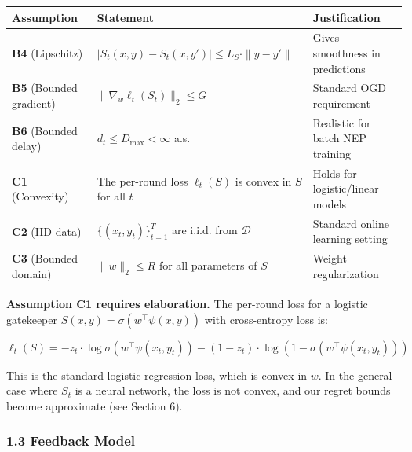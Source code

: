 \documentclass[
  12pt,
]{ctexart}
\begin{document}
\begin{longtable}[]{@{}
  >{\raggedright\arraybackslash}p{}
  >{\raggedright\arraybackslash}p{}
  >{\raggedright\arraybackslash}p{}@{}}
\toprule\noalign{}
\begin{minipage}[b]{\linewidth}\raggedright
Assumption
\end{minipage} & \begin{minipage}[b]{\linewidth}\raggedright
Statement
\end{minipage} & \begin{minipage}[b]{\linewidth}\raggedright
Justification
\end{minipage} \\
\midrule\noalign{}
\endhead
\bottomrule\noalign{}
\endlastfoot
\textbf{B4} (Lipschitz) &
\(|S_t(x,y) - S_t(x,y')| \leq L_S \cdot \|y - y'\|\) & Gives smoothness
in predictions \\
\textbf{B5} (Bounded gradient) & \(\|\nabla_w \ell_t(S_t)\|_2 \leq G\) &
Standard OGD requirement \\
\textbf{B6} (Bounded delay) & \(d_t \leq D_{\max} < \infty\) a.s. &
Realistic for batch NEP training \\
\textbf{C1} (Convexity) & The per-round loss \(\ell_t(S)\) is convex in
\(S\) for all \(t\) & Holds for logistic/linear models \\
\textbf{C2} (IID data) & \(\{(x_t, y_t)\}_{t=1}^T\) are i.i.d. from
\(\mathcal{D}\) & Standard online learning setting \\
\textbf{C3} (Bounded domain) & \(\|w\|_2 \leq R\) for all parameters of
\(S\) & Weight regularization \\
\end{longtable}

\textbf{Assumption C1 requires elaboration.} The per-round loss for a
logistic gatekeeper \(S(x,y) = \sigma(w^\top \psi(x,y))\) with
cross-entropy loss is:

\[\ell_t(S) = -z_t \cdot \log\sigma(w^\top \psi(x_t, y_t)) - (1-z_t) \cdot \log(1 - \sigma(w^\top \psi(x_t, y_t)))\]

This is the standard logistic regression loss, which is convex in \(w\).
In the general case where \(S_t\) is a neural network, the loss is not
convex, and our regret bounds become approximate (see Section 6).

\subsubsection{1.3 Feedback Model}\label{feedback-model}
\end{document}
